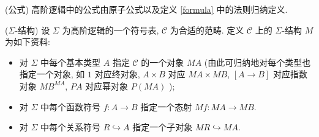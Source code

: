 \begin{definition}
	{(公式)}
	高阶逻辑中的公式由原子公式以及定义 \ref{formula} 中的法则归纳定义.
\end{definition}

\begin{definition}
	{($\Sigma$-结构)}
	设 $\Sigma$ 为高阶逻辑的一个符号表, $\mathcal C$ 为合适的范畴.
	定义 $\mathcal C$ 上的 $\Sigma$-结构 $M$ 为如下资料:
	\begin{itemize}
		\item 对 $\Sigma$ 中每个基本类型 $A$ 指定 $\mathcal C$ 的一个对象 $MA$ (由此可归纳地对每个类型也指定一个对象, 如 $1$ 对应终对象, $A\times B$ 对应 $MA\times MB$, $[A\to B]$ 对应指数对象 $MB^{MA}$, $PA$ 对应幂对象 $P(MA)$
		);
		\item 对 $\Sigma$ 中每个函数符号 $f\colon A\to B$ 指定一个态射 $Mf\colon MA\to MB$.
		\item 对 $\Sigma$ 中每个关系符号 $R\hookrightarrow A$ 指定一个子对象 $MR \hookrightarrow MA$.
	\end{itemize}
\end{definition}

